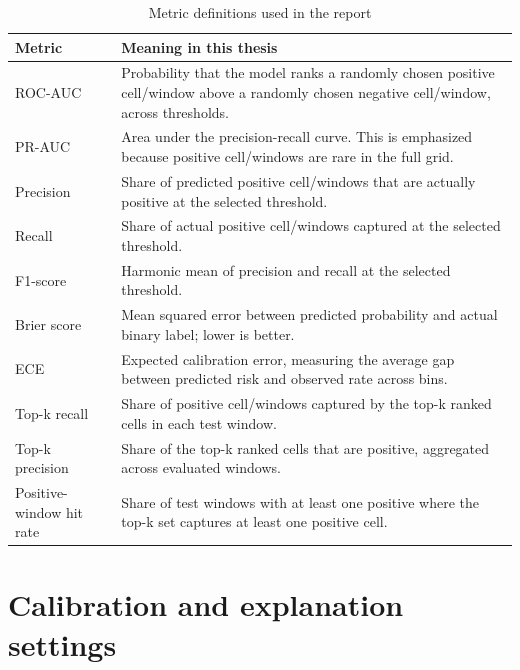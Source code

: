 \begin{table}[H]
\centering
\caption{Metric definitions used in the report}
\label{tab:appendix_metric_definitions}
\small
\begin{tabularx}{\textwidth}{L{0.24\textwidth}Y}
\toprule
\textbf{Metric} & \textbf{Meaning in this thesis} \\
\midrule
ROC-AUC & Probability that the model ranks a randomly chosen positive cell/window above a randomly chosen negative cell/window, across thresholds. \\
PR-AUC & Area under the precision-recall curve. This is emphasized because positive cell/windows are rare in the full grid. \\
Precision & Share of predicted positive cell/windows that are actually positive at the selected threshold. \\
Recall & Share of actual positive cell/windows captured at the selected threshold. \\
F1-score & Harmonic mean of precision and recall at the selected threshold. \\
Brier score & Mean squared error between predicted probability and actual binary label; lower is better. \\
ECE & Expected calibration error, measuring the average gap between predicted risk and observed rate across bins. \\
Top-k recall & Share of positive cell/windows captured by the top-k ranked cells in each test window. \\
Top-k precision & Share of the top-k ranked cells that are positive, aggregated across evaluated windows. \\
Positive-window hit rate & Share of test windows with at least one positive where the top-k set captures at least one positive cell. \\
\bottomrule
\end{tabularx}
\end{table}

\section{Calibration and explanation settings}


